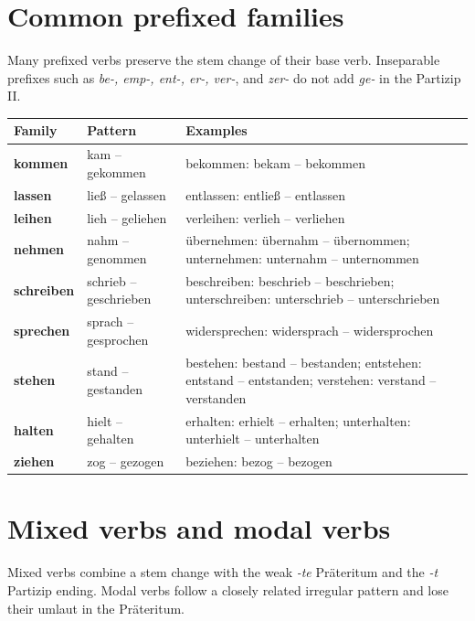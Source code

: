 \section{Common prefixed families}

Many prefixed verbs preserve the stem change of their base verb. Inseparable
prefixes such as \textit{be-, emp-, ent-, er-, ver-}, and \textit{zer-} do not
add \textit{ge-} in the Partizip II\@.

\begin{center}
\small
{}
\begin{tabularx}{\textwidth}{@{}>{\bfseries}l l X@{}}
\toprule
Family & Pattern & Examples \\
\midrule
kommen & kam -- gekommen & bekommen: bekam -- bekommen \\
lassen & ließ -- gelassen & entlassen: entließ -- entlassen \\
leihen & lieh -- geliehen & verleihen: verlieh -- verliehen \\
nehmen & nahm -- genommen & übernehmen: übernahm -- übernommen; unternehmen: unternahm -- unternommen \\
schreiben & schrieb -- geschrieben & beschreiben: beschrieb -- beschrieben; unterschreiben: unterschrieb -- unterschrieben \\
sprechen & sprach -- gesprochen & widersprechen: widersprach -- widersprochen \\
stehen & stand -- gestanden & bestehen: bestand -- bestanden; entstehen: entstand -- entstanden; verstehen: verstand -- verstanden \\
halten & hielt -- gehalten & erhalten: erhielt -- erhalten; unterhalten: unterhielt -- unterhalten \\
ziehen & zog -- gezogen & beziehen: bezog -- bezogen \\
\bottomrule
\end{tabularx}
\end{center}

\section{Mixed verbs and modal verbs}

Mixed verbs combine a stem change with the weak \textit{-te} Präteritum and
the \textit{-t} Partizip ending. Modal verbs follow a closely related irregular
pattern and lose their umlaut in the Präteritum.

